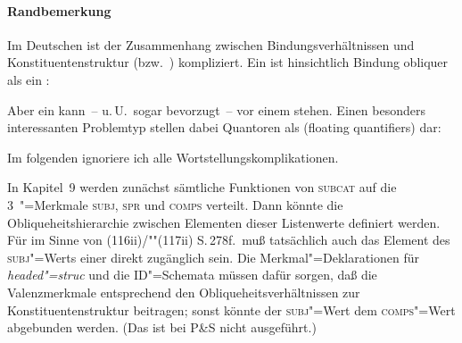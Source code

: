 \documentclass[output=paper]{LSP/langsci}
\begin{document}
\paragraph*{Randbemerkung}\randnum\label{rn:17-23} Im Deutschen ist der Zusammenhang zwischen Bindungsverhältnissen und Konstituentenstruktur (bzw.\ )
kompliziert. Ein  ist hinsichtlich Bindung obliquer als ein :
\setcounter{xnumi}{0}
\begin{exe}
\ex
\label{ex:17-1}
\begin{xlist}
\end{xlist}
\end{exe}
\randnum\label{rn:17-24}Aber ein  kann~-- u.\,U.\ sogar bevorzugt~-- vor einem  stehen. Einen besonders interessanten Problemtyp stellen dabei Quantoren als  (floating quantifiers) dar:
\begin{exe}
\ex
\label{ex:17-2}
\begin{xlist}
\end{xlist}
\end{exe}
Im folgenden ignoriere ich alle Wortstellungskomplikationen.
\vspace{1em}

\randnum\label{rn:17-25}In Kapitel~9 werden zunächst sämtliche Funktionen von
\textsc{subcat} auf die 3~"=Merkmale \textsc{subj},
\textsc{spr} und \textsc{comps} verteilt. Dann könnte die
Obliqueheits\-hierarchie zwischen Elementen dieser Listenwerte definiert
werden. Für  im Sinne von (116ii)/""(117ii) S.\,278f.\ muß
tatsächlich auch das Element des \textsc{subj}"=Werts einer  direkt
zugänglich sein. Die Merkmal"=Deklarationen für\Hack{\break} \textit{headed"=struc} und die
ID"=Schemata müssen dafür sorgen, daß die Valenzmerkmale entsprechend
den Obliqueheitsverhältnissen zur Konstituentenstruktur beitragen;
sonst könnte \zb der \textsc{subj}"=Wert  dem
\textsc{comps}"=Wert abgebunden werden. (Das ist bei P\&S nicht
ausgeführt.)
\end{document}
